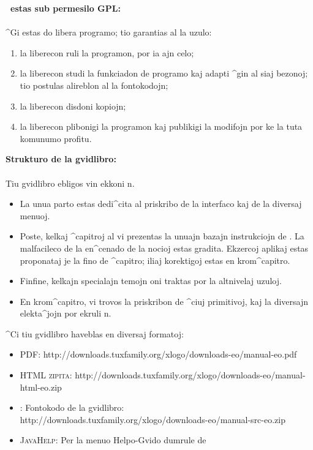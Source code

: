 \noindent \textbf{\xlogo\ estas sub permesilo GPL:} \\ \\
^Gi estas do libera programo; tio garantias al la uzulo:
\begin{enumerate}
 \item la liberecon ruli la programon, por ia ajn celo;
 \item la liberecon studi la funkciadon de programo kaj adapti ^gin al
   siaj bezonoj; tio postulas alireblon al la fontokodojn;
 \item la liberecon disdoni kopiojn;
 \item la liberecon plibonigi la programon kaj publikigi la modifojn
   por ke la tuta komunumo profitu.
\end{enumerate}
\noindent \textbf{Strukturo de la gvidlibro:}\\ \\
Tiu gvidlibro ebligos vin ekkoni \xlogo n.
\begin{itemize}
\item La unua parto estas dedi^cita al priskribo de la interfaco kaj
  de la diversaj menuoj.
\item Poste, kelkaj ^capitroj al vi prezentas la unuajn bazajn
  instrukciojn de \xlogo.  La malfacileco de la en^cenado de la nocioj
  estas gradita.  Ekzercoj aplikaj estas proponataj je la fino de
  ^capitro; iliaj korektigoj estas en krom^capitro.
\item Finfine, kelkajn specialajn temojn oni traktas por la altnivelaj
  uzuloj.
\item En krom^capitro, vi trovos la priskribon de ^ciuj primitivoj,
  kaj la diversajn elekta^jojn por ekruli \xlogo n.
\end{itemize}
\vspace{0.5cm}
^Ci tiu gvidlibro haveblas en diversaj formatoj:
\begin{itemize}
 \item \textsc{PDF}: http://downloads.tuxfamily.org/xlogo/downloads-eo/manual-eo.pdf
 \item \textsc{HTML zipita}: http://downloads.tuxfamily.org/xlogo/downloads-eo/manual-html-eo.zip
 \item \LaTeXe: Fontokodo de la gvidlibro: http://downloads.tuxfamily.org/xlogo/downloads-eo/manual-src-eo.zip
 \item \textsc{JavaHelp}: Per la menuo Helpo-Gvido dumrule de \xlogo
\end{itemize}
